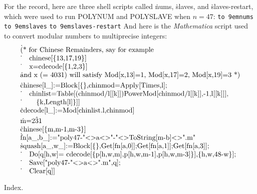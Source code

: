For the record, here are three shell scripts called %
\.{nums},
\.{slaves}, and \.{slaves-restart}, which were used to
run {\mc POLYNUM} and {\mc POLYSLAVE} when $n=47$:
\bigskip
\hbox{\qquad\tt\hbox to 9em{nums\hfil}}
\bigskip
\hbox{\qquad\tt\hbox to 9em{slaves\hfil}}
\bigskip
\hbox{\qquad\tt\hbox to 9em{slaves-restart\hfil}}
\bigskip
And here is the {\it Mathematica\/} script used to convert modular numbers
to multiprecise integers:
$$
\vbox{\halign{\.{#}\hfil\cr
(* for Chinese Remainders, say for example\cr
\quad   chinese[\{13,17,19\}]\cr
\quad   x=cdecode[\{1,2,3\}]\cr
and x (= 4031) will satisfy Mod[x,13]=1, Mod[x,17]=2, Mod[x,19]=3 *)\cr
\noalign{\smallskip}
chinese[l\_]:=Block[\{\},chinmod=Apply[Times,l];\cr
\quad chinlist=Table[(chinmod/l[[k]])PowerMod[chinmod/l[[k]],-1,l[[k]]],\cr
\qquad \{k,Length[l]\}]]\cr
cdecode[l\_]:=Mod[chinlist.l,chinmod]\cr
\noalign{\smallskip}
m=2\^31\cr
chinese[\{m,m-1,m-3\}]\cr
fn[a\_,b\_]:="poly47-"<>a<>"-"<>ToString[m-b]<>".m"\cr
squash[a\_,w\_]:=Block[\{\},Get[fn[a,0]];Get[fn[a,1]];Get[fn[a,3]];\cr
\quad Do[q[h,w]= cdecode[\{p[h,w,m],p[h,w,m-1],p[h,w,m-3]\}],\{h,w,48-w\}];\cr
\quad Save["poly47-"<>a<>".m",q];\cr
\quad Clear[q]]\cr
}}$$


\fi

Index.
\fi

\inx
\fin
\con
